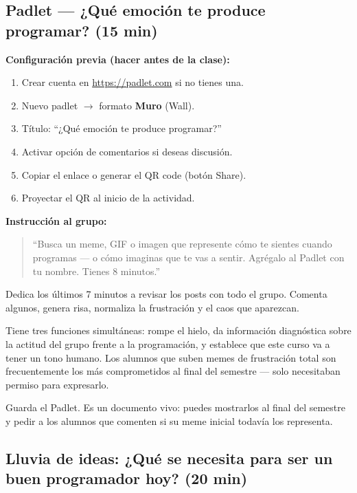 \documentclass[12pt, oneside]{article}
\begin{document}
\subsection{Padlet — ¿Qué emoción te produce programar? (15 min)}

\textbf{Configuración previa (hacer antes de la clase):}
\begin{enumerate}
  \item Crear cuenta en \url{https://padlet.com} si no tienes una.
  \item Nuevo padlet $\to$ formato \textbf{Muro} (Wall).
  \item Título: ``¿Qué emoción te produce programar?''
  \item Activar opción de comentarios si deseas discusión.
  \item Copiar el enlace o generar el QR code (botón Share).
  \item Proyectar el QR al inicio de la actividad.
\end{enumerate}

\textbf{Instrucción al grupo:}

\begin{quote}
  ``Busca un meme, GIF o imagen que represente cómo te sientes cuando
  programas — o cómo imaginas que te vas a sentir. Agrégalo al Padlet
  con tu nombre. Tienes 8 minutos.''
\end{quote}

Dedica los últimos 7 minutos a revisar los posts con todo el grupo. Comenta
algunos, genera risa, normaliza la frustración y el caos que aparezcan.

\begin{notaprofesor}
  Tiene tres funciones simultáneas: rompe el hielo, da información diagnóstica
  sobre la actitud del grupo frente a la programación, y establece que este
  curso va a tener un tono humano. Los alumnos que suben memes de frustración
  total son frecuentemente los más comprometidos al final del semestre — solo
  necesitaban permiso para expresarlo.

  \vspace{0.5em}
  Guarda el Padlet. Es un documento vivo: puedes mostrarlos al final del
  semestre y pedir a los alumnos que comenten si su meme inicial todavía
  los representa.
\end{notaprofesor}

\subsection{Lluvia de ideas: ¿Qué se necesita para ser un buen programador hoy? (20 min)}
\end{document}
